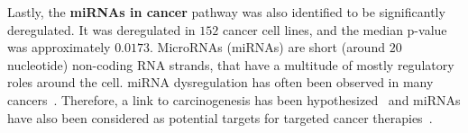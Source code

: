 Lastly, the \textbf{miRNAs in cancer} pathway was also identified to be significantly deregulated. It was deregulated in $152$ cancer cell lines, and the median p-value was approximately $0.0173$. MicroRNAs (miRNAs) are short (around $20$ nucleotide) non-coding RNA strands, that have a multitude of mostly regulatory roles around the cell.\@
miRNA dysregulation has often been observed in many cancers~\cite{mirna_dysregulation_cancer}. Therefore, a link to carcinogenesis has been hypothesized~\cite{mirna_dysregulation_cancer} and miRNAs have also been considered as potential targets for targeted cancer therapies~\cite{mirna_targeted_cancer_therapy}.
